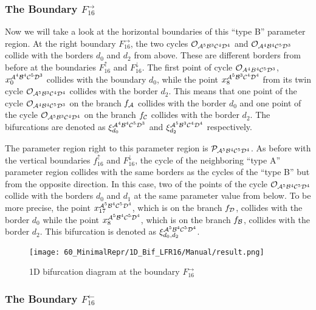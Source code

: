 \subsubsection{The Boundary $F_{16}^\rightarrow$}

Now we will take a look at the horizontal boundaries of this ``type B'' parameter region.
At the right boundary $F_{16}^\rightarrow$, the two cycles $\mathcal{O}_{\mathcal{A}^5\mathcal{B}^3\mathcal{C}^4\mathcal{D}^4}$ and $\mathcal{O}_{\mathcal{A}^4\mathcal{B}^4\mathcal{C}^5\mathcal{D}^3}$ collide with the borders $d_0$ and $d_2$ from above.
These are different borders from before at the boundaries $F_{16}^\uparrow$ and $F_{16}^\downarrow$.
The first point of cycle $\mathcal{O}_{A^4B^4\mathcal{C}^5\mathcal{D}^3}$, $x_{0}^{\mathcal{A}^4\mathcal{B}^4\mathcal{C}^5\mathcal{D}^3}$ collides with the boundary $d_0$, while the point $x_{8}^{\mathcal{A}^5\mathcal{B}^3\mathcal{C}^4\mathcal{D}^4}$ from its twin cycle $\mathcal{O}_{\mathcal{A}^5\mathcal{B}^3\mathcal{C}^4\mathcal{D}^4}$ collides with the border $d_2$.
This means that one point of the cycle $\mathcal{O}_{\mathcal{A}^4\mathcal{B}^4\mathcal{C}^5\mathcal{D}^3}$ on the branch $f_{\mathcal{A}}$ collides with the border $d_0$ and one point of the cycle $\mathcal{O}_{\mathcal{A}^5\mathcal{B}^3\mathcal{C}^4\mathcal{D}^4}$ on the branch $f_{\mathcal{C}}$ collides with the border $d_2$.
The bifurcations are denoted as $\xi_{d_0}^{\mathcal{A}^4\mathcal{B}^4\mathcal{C}^5\mathcal{D}^3}$ and $\xi_{d_2}^{\mathcal{A}^5\mathcal{B}^3\mathcal{C}^4\mathcal{D}^4}$ respectively.

The parameter region right to this parameter region is $\mathcal{P}_{\mathcal{A}^5\mathcal{B}^4\mathcal{C}^5\mathcal{D}^4}$.
As before with the vertical boundaries $f_{16}^\uparrow$ and $F_{16}^\downarrow$, the cycle of the neighboring ``type A'' parameter region collides with the same borders as the cycles of the ``type B'' but from the opposite direction.
In this case, two of the points of the cycle $\mathcal{O}_{\mathcal{A}^5\mathcal{B}^4\mathcal{C}^5\mathcal{D}^4}$ collide with the borders $d_0$ and $d_1$ at the same parameter value from below.
To be more precise, the point $x_{17}^{\mathcal{A}^5\mathcal{B}^4\mathcal{C}^5\mathcal{D}^4}$, which is on the branch $f_{\mathcal{D}}$, collides with the border $d_0$ while the point $x_{8}^{\mathcal{A}^5\mathcal{B}^4\mathcal{C}^5\mathcal{D}^4}$, which is on the branch $f_{\mathcal{B}}$, collides with the border $d_2$.
This bifurcation is denoted as $\xi_{d_0, d_2}^{\mathcal{A}^5\mathcal{B}^4\mathcal{C}^5\mathcal{D}^4}$.

\begin{figure}
    \centering
    \texttt{[image: 60\_MinimalRepr/1D\_Bif\_LFR16/Manual/result.png]}
    \label{fig:final.bifurcation.F.right}
    \caption{1D bifurcation diagram at the boundary $F_{16}^\rightarrow$}
\end{figure}

\subsubsection{The Boundary $F_{16}^\leftarrow$}

